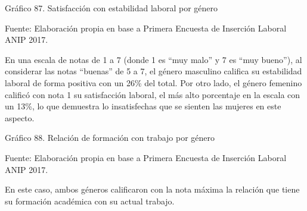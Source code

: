 \documentclass{article}
\begin{document}
Gráfico 87. Satisfacción con estabilidad laboral por género


Fuente: Elaboración propia en base a Primera Encuesta de Inserción Laboral ANIP 2017.

En una escala de notas de 1 a 7 (donde 1 es “muy malo” y 7 es “muy bueno”), al considerar las notas “buenas” de 5 a 7, el género masculino califica su estabilidad laboral de forma positiva con un 26\% del total. Por otro lado, el género femenino calificó con nota 1 su satisfacción laboral, el más alto porcentaje en la escala con un 13\%, lo que demuestra lo insatisfechas que se sienten las mujeres en este aspecto.

Gráfico 88. Relación de formación con trabajo por género


Fuente: Elaboración propia en base a Primera Encuesta de Inserción Laboral ANIP 2017.

En este caso, ambos géneros calificaron con la nota máxima la relación que tiene su formación académica con su actual trabajo.
\end{document}
